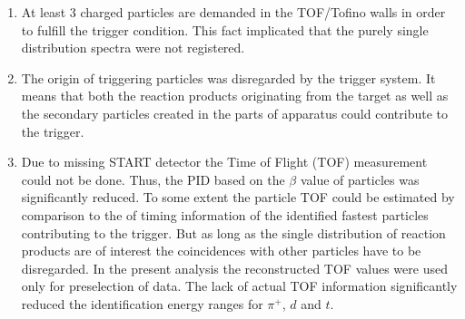 \begin{enumerate}
	\item At least 3 charged particles are demanded in the TOF/Tofino walls in order to fulfill the trigger condition. 
	This fact implicated that the purely single distribution spectra were not registered. 
	\item The origin of triggering particles was disregarded by the trigger system. 
	It means that both the reaction products originating from the target 
	as well as the secondary particles created in the parts of apparatus could contribute to the trigger.
	\item Due to missing START detector the Time of Flight (TOF) measurement could not be done. 
	Thus, the PID based on the $\beta$ value of particles was significantly reduced. 
    To some extent the particle TOF could be estimated by comparison to the of timing information 
    of the identified fastest particles contributing to the trigger. But as long as the single distribution 
    of reaction products are of interest the coincidences with other particles have to be disregarded.
    In the present analysis the reconstructed TOF values were used only for preselection of data. 
    The lack of actual TOF information significantly reduced the identification energy ranges for $\pi{^+}$, $d$ and $t$.	
\end{enumerate}

